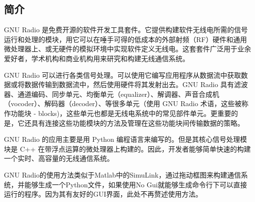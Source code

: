 		\subsection{简介}
			\par GNU Radio 是免费开源的软件开发工具套件。它提供构建软件无线电所需的信号运行和处理的模块，用它可以在唾手可得的低成本的外部射频（RF）硬件和通用微处理器上、或无硬件的模拟环境中实现软件定义无线电。这套套件广泛用于业余爱好者，学术机构和商业机构用来研究和构建无线通信系统。
			\par GNU Radio 可以进行各类信号处理。可以使用它编写应用程序从数据流中获取数据或将数据传输到数据流中，然后使用硬件将其发射出去。GNU Radio 具有滤波器、通道编码、同步单元、均衡单元（equalizer）、解调器、声音合成机（vocoder）、解码器（decoder）、等很多单元（使用 GNU Radio 术语，这些被称作功能块 - blocks)，这些单元也都是无线电系统中的常见部件单元。更重要的是，它还具有连接这些功能模块的方法及管理在这些功能块间传输数据的策略。
			\par GNU Radio 的应用主要是用 Python 编程语言来编写的。但是其核心信号处理模块是 C++ 在带浮点运算的微处理器上构建的。因此，开发者能够简单快速的构建一个实时、高容量的无线通信系统。
			\par GNU Radio的使用方法类似于Matlab中的SimuLink，通过拖动框图来构建通信系统，并能够生成一个Python文件，如果使用No Gui就能够生成命令行下可以直接运行的程序。因为其有友好的GUI界面，此处不再赘述使用方法。
